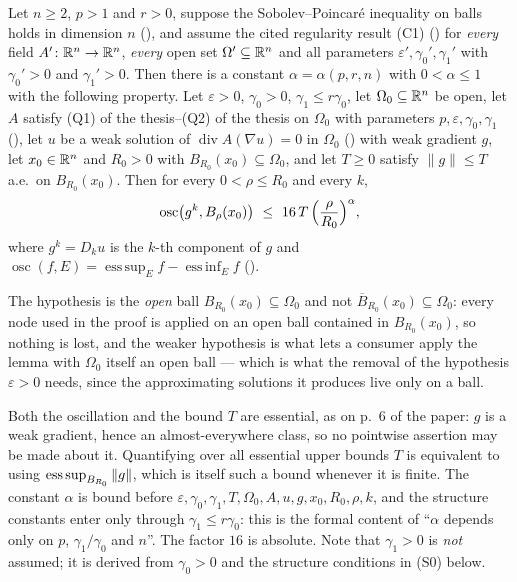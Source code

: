 \begin{lemma}
Let $n\ge2$, $p>1$ and $r>0$, suppose the Sobolev--Poincar\'e inequality on
balls holds in dimension $n$ (), and assume
the cited regularity result (C1) () for
\emph{every} field $A'\colon\mathbb{R}^n\to\mathbb{R}^n$, \emph{every} open set
$\Omega'\subseteq\mathbb{R}^n$ and all parameters $\varepsilon',\gamma_0',\gamma_1'$
with $\gamma_0'>0$ and $\gamma_1'>0$.  Then there is a constant
$\alpha=\alpha(p,r,n)$ with $0<\alpha\le1$ with the following property.  Let
$\varepsilon>0$, $\gamma_0>0$, $\gamma_1\le r\gamma_0$, let
$\Omega_0\subseteq\mathbb{R}^n$ be open, let $A$ satisfy (Q1) of the thesis--(Q2) of the thesis
on $\Omega_0$ with parameters $p,\varepsilon,\gamma_0,\gamma_1$
(), let $u$ be a weak solution of
$\operatorname{div}A(\nabla u)=0$ in $\Omega_0$ ()
with weak gradient $g$, let $x_0\in\mathbb{R}^n$ and $R_0>0$ with
$B_{R_0}(x_0)\subseteq\Omega_0$, and let $T\ge0$ satisfy $\|g\|\le T$ a.e.\ on
$B_{R_0}(x_0)$.  Then for every $0<\rho\le R_0$ and every $k$,
\[
\operatorname*{osc}\bigl(g^k,B_\rho(x_0)\bigr)
\ \le\ 16\,T\,\Bigl(\frac{\rho}{R_0}\Bigr)^{\alpha},
\]
where $g^k=D_ku$ is the $k$-th component of $g$ and
$\operatorname*{osc}(f,E)=\operatorname{ess\,sup}_Ef-
\operatorname{ess\,inf}_Ef$ ().

The hypothesis is the \emph{open} ball $B_{R_0}(x_0)\subseteq\Omega_0$ and not
$\overline B_{R_0}(x_0)\subseteq\Omega_0$: every node used in the proof is
applied on an open ball contained in $B_{R_0}(x_0)$, so nothing is lost, and the
weaker hypothesis is what lets a consumer apply the lemma with $\Omega_0$ itself
an open ball --- which is what the removal of the hypothesis $\varepsilon>0$
needs, since the approximating solutions it produces live only on a ball.

Both the oscillation and the bound $T$ are essential, as on p.~6 of the paper:
$g$ is a weak gradient, hence an almost-everywhere class, so no pointwise
assertion may be made about it.  Quantifying over all essential upper bounds $T$
is equivalent to using $\operatorname*{ess\,sup}_{B_{R_0}}\|g\|$, which is itself such a bound
whenever it is finite.  The constant $\alpha$ is bound before
$\varepsilon,\gamma_0,\gamma_1,T,\Omega_0,A,u,g,x_0,R_0,\rho,k$, and the
structure constants enter only through $\gamma_1\le r\gamma_0$: this is the
formal content of ``$\alpha$ depends only on $p$, $\gamma_1/\gamma_0$ and $n$''.
The factor $16$ is absolute.  Note that $\gamma_1>0$ is \emph{not} assumed; it
is derived from $\gamma_0>0$ and the structure conditions in (S0) below.


\end{lemma}
